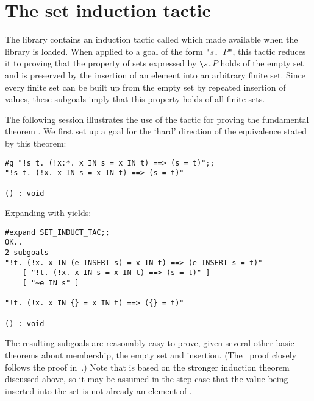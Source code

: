 \section{The set induction tactic}

The library contains
 an induction tactic
called  which made available when the library is loaded.
When applied to a goal of the form {\small\verb!"!$s$\verb!. !$P$\verb!"!},
this tactic reduces it to proving that the property of sets expressed by
{\small\verb!\!$s$\verb!.!$P$} holds of the empty set and is preserved by the
insertion of an element into an arbitrary finite set.  Since every finite set
can be built up from the empty set by repeated insertion of values, these
subgoals imply that this property holds of all finite sets.

The following session illustrates the use of the tactic 
for proving the fundamental theorem . We first set up a goal for
the `hard' direction of the equivalence stated by this theorem:

\setcounter{sessioncount}{1}
\begin{session}\begin{verbatim}
#g "!s t. (!x:*. x IN s = x IN t) ==> (s = t)";;
"!s t. (!x. x IN s = x IN t) ==> (s = t)"

() : void
\end{verbatim}\end{session}

\noindent Expanding with  yields:

\begin{session}\begin{verbatim}
#expand SET_INDUCT_TAC;;
OK..
2 subgoals
"!t. (!x. x IN (e INSERT s) = x IN t) ==> (e INSERT s = t)"
    [ "!t. (!x. x IN s = x IN t) ==> (s = t)" ]
    [ "~e IN s" ]

"!t. (!x. x IN {} = x IN t) ==> ({} = t)"

() : void
\end{verbatim}\end{session}

\noindent The resulting subgoals are reasonably easy to prove, given several
other basic theorems about membership, the empty set and insertion. (The \HOL\
proof closely follows the proof in~\cite{manna}.) Note that
 is based on the stronger induction theorem discussed
above, so it may be assumed in the step case that the value \ml{e} being
inserted into the set  is not already an element of
\ml{s}.%
%


